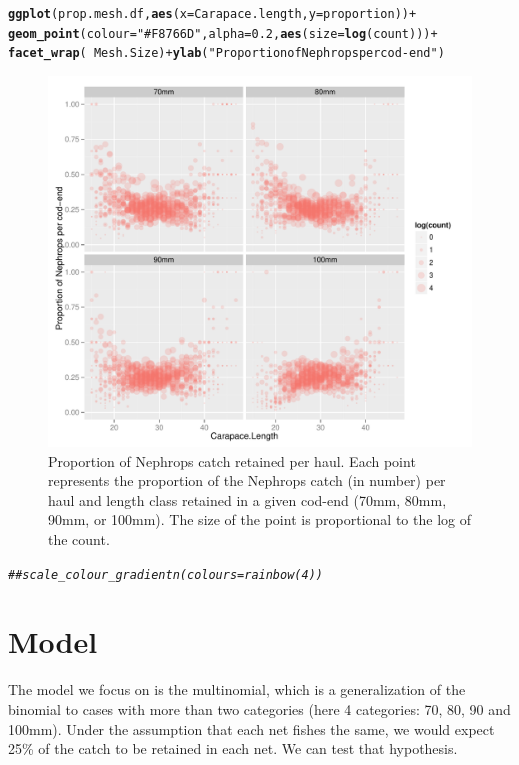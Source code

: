 \documentclass[12pt]{article}\usepackage[]{graphicx}\usepackage[]{color}
\makeatletter
\def\maxwidth{ %
  \ifdim\Gin@nat@width>\linewidth
    \linewidth
  \else
    \Gin@nat@width
  \fi
}
\newcommand{\hlnum}[1]{\textcolor[rgb]{0.686,0.059,0.569}{#1}}%
\newcommand{\hlstr}[1]{\textcolor[rgb]{0.192,0.494,0.8}{#1}}%
\newcommand{\hlcom}[1]{\textcolor[rgb]{0.678,0.584,0.686}{\textit{#1}}}%
\newcommand{\hlopt}[1]{\textcolor[rgb]{0,0,0}{#1}}%
\newcommand{\hlstd}[1]{\textcolor[rgb]{0.345,0.345,0.345}{#1}}%
\newcommand{\hlkwc}[1]{\textcolor[rgb]{0.333,0.667,0.333}{#1}}%
\newcommand{\hlkwd}[1]{\textcolor[rgb]{0.737,0.353,0.396}{\textbf{#1}}}%
\newenvironment{kframe}{%
 \def\at@end@of@kframe{}%
 \ifinner\ifhmode%
  \def\at@end@of@kframe{\end{minipage}}%
  \begin{minipage}{\columnwidth}%
 \fi\fi%
 \def\FrameCommand##1{\hskip\@totalleftmargin \hskip-\fboxsep
 \colorbox{shadecolor}{##1}\hskip-\fboxsep
     \hskip-\linewidth \hskip-\@totalleftmargin \hskip\columnwidth}%
 \MakeFramed {\advance\hsize-\width
   \@totalleftmargin\z@ \linewidth\hsize
   \@setminipage}}%
 {\par\unskip\endMakeFramed%
 \at@end@of@kframe}
\newenvironment{knitrout}{}{} %
\makeatother
\begin{document}
\begin{knitrout}
\begin{kframe}
\begin{alltt}
\hlkwd{ggplot}\hlstd{(prop.mesh.df,} \hlkwd{aes}\hlstd{(}\hlkwc{x} \hlstd{= Carapace.length,} \hlkwc{y} \hlstd{= proportion))} \hlopt{+}
  \hlkwd{geom_point}\hlstd{(}\hlkwc{colour} \hlstd{=} \hlstr{"#F8766D"}\hlstd{,} \hlkwc{alpha} \hlstd{=} \hlnum{0.2}\hlstd{,} \hlkwd{aes}\hlstd{(}\hlkwc{size} \hlstd{=} \hlkwd{log}\hlstd{(count)))} \hlopt{+}
  \hlkwd{facet_wrap}\hlstd{(}\hlopt{~} \hlstd{Mesh.Size)} \hlopt{+} \hlkwd{ylab}\hlstd{(}\hlstr{"Proportion of Nephrops per cod-end"}\hlstd{)}
\end{alltt}
\end{kframe}\begin{figure}
\includegraphics[width=\maxwidth]{figure/unnamed-chunk-4-1} \caption[Proportion of Nephrops catch retained per haul]{Proportion of Nephrops catch retained per haul. Each point represents the proportion of the Nephrops catch (in number) per haul and length class retained in a given cod-end (70mm, 80mm, 90mm, or 100mm). The size of the point is proportional to the log of the count.}\label{fig:unnamed-chunk-4}
\end{figure}

\begin{kframe}\begin{alltt}
\hlcom{##scale_colour_gradientn(colours=rainbow(4))}
\end{alltt}
\end{kframe}
\end{knitrout}

\section{Model}
The model we focus on is the multinomial, which is a generalization of the binomial to cases with more than two categories (here 4 categories: 70, 80, 90 and 100mm). Under the assumption that each net fishes the same, we would expect 25\% of the catch to be retained in each net. We can test that hypothesis.
\end{document}
